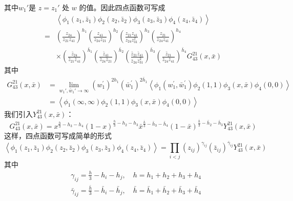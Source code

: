 其中$w_1' $是 $z=z_1'$ 处 $w$ 的值。因此四点函数可写成
\begin{equation}
	\begin{aligned} &\left\langle\phi_{1}\left(z_{1}, \bar{z}_{1}\right) \phi_{2}\left(z_{2}, \bar{z}_{2}\right) \phi_{3}\left(z_{3}, \bar{z}_{3}\right) \phi_{4}\left(z_{4}, \bar{z}_{4}\right)\right\rangle \\ =&\left(\frac{z_{24}}{z_{21} z_{41}}\right)^{h_{1}}\left(\frac{z_{41}}{z_{24} z_{21}}\right)^{h_{2}}\left(\frac{z_{21} z_{41}}{z_{24} z_{31}^{2}}\right)^{h_{3}}\left(\frac{z_{21}}{z_{24} z_{41}}\right)^{h_{4}} \\ &\times\left(\frac{\bar{z}_{24}}{\bar{z}_{21} \bar{z}_{41}}\right)^{\bar{h}_{1}}\left(\frac{\bar{z}_{41}}{\bar{z}_{24} \bar{z}_{21}}\right)^{\bar{h}_{2}}\left(\frac{\bar{z}_{21} \bar{z}_{41}}{\bar{z}_{24} \bar{z}_{31}^{2}}\right)^{\bar{h}_{3}}\left(\frac{\bar{z}_{21}}{\bar{z}_{24} \bar{z}_{41}}\right)^{\bar{h}_{4}} G^{21}_{43}(x, \bar{x}) \end{aligned}
\end{equation}
其中
\begin{equation}
	\begin{aligned} G_{43}^{21}(x, \bar{x}) &=\lim _{w_{1}', \bar{w}_{1}' \rightarrow \infty}\left(w_{1}^{\prime}\right)^{2 h_{1}}\left(\bar{w}_{1}^{\prime}\right)^{2 \bar{h}_{1}}\left\langle\phi_{1}\left(w_{1}^{\prime}, \bar{w}_{1}^{\prime}\right) \phi_{2}(1,1) \phi_{3}(x, \bar{x}) \phi_{4}(0,0)\right\rangle \\ &=\left\langle\phi_{1}(\infty, \infty) \phi_{2}(1,1) \phi_{3}(x, \bar{x}) \phi_{4}(0,0)\right\rangle \end{aligned}
\end{equation}
我们引入$ Y_{43}^{21}(x, \bar{x}) $：
\begin{equation}
	G_{43}^{21}(x, \bar{x})=x^{\frac{h}{3}-h_{3}-h_{4}}(1-x)^{\frac{h}{3}-h_{2}-h_{3}} \bar{x}^{\frac{\bar{h}}{3}-\bar{h}_{3}-\bar{h}_{4}}(1-\bar{x})^{\frac{\bar{h}}{3}-\bar{h}_{2}-\bar{h}_{3}} Y_{43}^{21}(x, \bar{x})
\end{equation}
这样，四点函数可写成简单的形式
\begin{equation}
	\left\langle\phi_{1}\left(z_{1}, \bar{z}_{1}\right) \phi_{2}\left(z_{2}, \bar{z}_{2}\right) \phi_{3}\left(z_{3}, \bar{z}_{3}\right) \phi_{4}\left(z_{4}, \bar{z}_{4}\right)\right\rangle=\prod_{i<j}\left(z_{i j}\right)^{\gamma_{i j}}\left(\bar{z}_{i j}\right)^{\bar{\gamma}_{i j}} Y_{43}^{21}(x, \bar{x})
\end{equation}
其中
\begin{equation}
	\begin{aligned} &\gamma_{i j}=\frac{h}{3}-h_{i}-h_{j}, \quad h=h_{1}+h_{2}+h_{3}+h_{4}\\ &\bar{\gamma}_{i j}=\frac{\bar{h}}{3}-\bar{h}_{i}-\bar{h}_{j}, \quad \bar{h}=\bar{h}_{1}+\bar{h}_{2}+\bar{h}_{3}+\bar{h}_{4} \end{aligned}
\end{equation}

